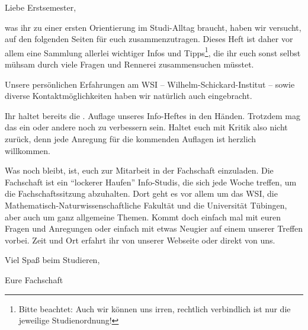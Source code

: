 Liebe Erstsemester,

was ihr zu einer ersten Orientierung im Studi-Alltag braucht, haben wir
versucht, auf den folgenden Seiten für euch zusammenzutragen.  Dieses Heft
ist daher vor allem eine Sammlung allerlei wichtiger Infos und Tipps\footnote{
Bitte beachtet: Auch wir können uns irren, rechtlich verbindlich ist nur die
jeweilige Studienordnung!}, die ihr
euch sonst selbst mühsam durch viele Fragen und Rennerei %
zusammensuchen müsstet.

Unsere persönlichen Erfahrungen am WSI -- Wilhelm-Schickard-Institut -- sowie diverse Kontaktmöglichkeiten
haben wir natürlich auch eingebracht.  %

Ihr haltet bereits die \number\auflage. Auflage unseres Info-Heftes in den
Händen. Trotzdem mag das ein oder andere noch zu verbessern sein.  Haltet
euch mit Kritik also nicht zurück, denn jede Anregung für die kommenden
Auf\/lagen ist herzlich willkommen.

Was noch bleibt, ist, euch zur Mitarbeit in der Fachschaft einzuladen.  Die
Fachschaft ist ein "`lockerer Haufen"' Info-Studis, die sich
jede Woche treffen, um die Fachschaftssitzung abzuhalten.
Dort geht es vor allem um das WSI, die Mathematisch-Naturwissenschaftliche
Fakultät und die Universität Tübingen, aber auch um ganz
allgemeine Themen. Kommt doch einfach mal mit euren Fragen und Anregungen
oder einfach mit etwas Neugier auf einem unserer Treffen vorbei.  Zeit
und Ort erfahrt ihr von unserer Webseite oder direkt von uns.

\bigskip

Viel Spaß beim Studieren,

Eure Fachschaft
\vfill
\bigskip

\eject
